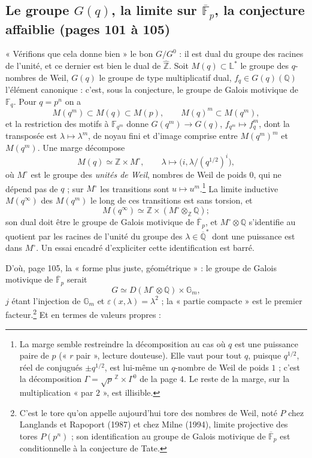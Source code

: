 \documentclass[11pt,a4paper]{article}
\begin{document}
\subsection*{Le groupe $G(q)$, la limite sur $\overline{\mathbb{F}}_{p}$, la conjecture affaiblie (pages 101 à 105)}

« Vérifions que cela donne bien » le bon $G/G^{0}$ : il est dual du groupe des
racines de l'unité, et ce dernier est bien le dual de $\widehat{\mathbb{Z}}$.
Soit $M(q) \subset \mathbb{L}^{*}$ le groupe des $q$-nombres de Weil, $G(q)$ le
groupe de type multiplicatif dual, $f_{q} \in G(q)(\mathbb{Q})$ l'élément
canonique : c'est, sous la conjecture, le groupe de Galois motivique de
$\mathbb{F}_{q}$. Pour $q = p^{n}$ on a
\[
  M(q^{m}) \subset M(q) \subset M(p), \qquad M(q)^{m} \subset M(q^{m}) ,
\]
et la restriction des motifs à $\mathbb{F}_{q^{m}}$ donne $G(q^{m}) \to G(q)$,
$f_{q^{m}} \mapsto f_{q}^{m}$, dont la transposée est $\lambda \mapsto
\lambda^{m}$, de noyau fini et d'image comprise entre $M(q^{m})^{m}$ et
$M(q^{m})$. Une marge décompose
\[
  M(q) \simeq \mathbb{Z} \times M^{\circ}, \qquad \lambda \mapsto \bigl(i,
  \lambda/(q^{1/2})^{i}\bigr) ,
\]
où $M^{\circ}$ est le groupe des \emph{unités de Weil}, nombres de Weil de poids
$0$, qui ne dépend pas de $q$ ; sur $M^{\circ}$ les transitions sont $u \mapsto
u^{m}$.\footnote{La marge semble restreindre la décomposition au cas où $q$ est
une puissance paire de $p$ (« $r$ pair », lecture douteuse). Elle vaut pour tout
$q$, puisque $q^{1/2}$, réel de conjugués $\pm q^{1/2}$, est lui-même un
$q$-nombre de Weil de poids $1$ ; c'est la décomposition $\Gamma = \sqrt{p}^{\,
\mathbb{Z}} \times \Gamma^{0}$ de la page 4. Le reste de la marge, sur la
multiplication « par $2$ », est illisible.} La limite inductive $M(q^{\infty})$
des $M(q^{m})$ le long de ces transitions est sans torsion, et
\[
  M(q^{\infty}) \simeq \mathbb{Z} \times (M^{\circ} \otimes_{\mathbb{Z}}
  \mathbb{Q}) ;
\]
son dual doit être le groupe de Galois motivique de $\overline{\mathbb{F}}_{p}$,
et $M^{\circ} \otimes \mathbb{Q}$ s'identifie au quotient par les racines de
l'unité du groupe des $\lambda \in \overline{\mathbb{Q}}^{*}$ dont une puissance
est dans $M^{\circ}$. Un essai encadré d'expliciter cette identification est
barré.

D'où, page 105, la « forme plus juste, géométrique » : le groupe de Galois
motivique de $\overline{\mathbb{F}}_{p}$ serait
\[
  G \simeq D(M^{\circ} \otimes \mathbb{Q}) \times \mathbb{G}_{m} ,
\]
$j$ étant l'injection de $\mathbb{G}_{m}$ et $\varepsilon(x, \lambda) =
\lambda^{2}$ ; la « partie compacte » est le premier facteur.\footnote{C'est le
tore qu'on appelle aujourd'hui tore des nombres de Weil, noté $P$ chez Langlands
et Rapoport (1987) et chez Milne (1994), limite projective des tores $P(p^{n})$ ;
son identification au groupe de Galois motivique de $\overline{\mathbb{F}}_{p}$
est conditionnelle à la conjecture de Tate.} Et en termes de valeurs propres :
\end{document}
